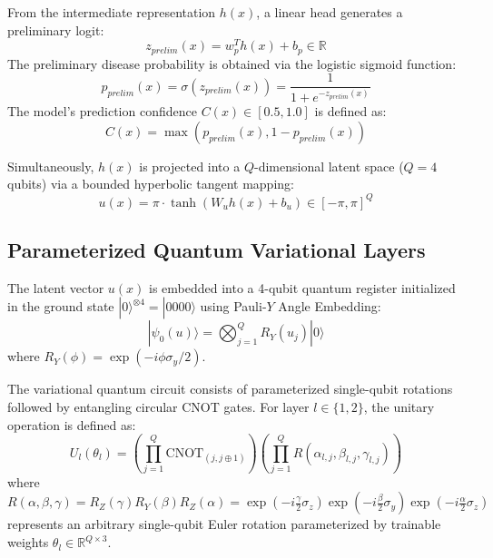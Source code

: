 \documentclass[conference]{IEEEtran}
\begin{document}
From the intermediate representation $h(x)$, a linear head generates a preliminary logit:
\begin{equation}
z_{prelim}(x) = w_p^T h(x) + b_p \in \mathbb{R}
\end{equation}
The preliminary disease probability is obtained via the logistic sigmoid function:
\begin{equation}
p_{prelim}(x) = \sigma(z_{prelim}(x)) = \frac{1}{1 + e^{-z_{prelim}(x)}}
\end{equation}
The model's prediction confidence $C(x) \in [0.5, 1.0]$ is defined as:
\begin{equation}
C(x) = \max\left(p_{prelim}(x), 1 - p_{prelim}(x)\right)
\end{equation}

Simultaneously, $h(x)$ is projected into a $Q$-dimensional latent space ($Q=4$ qubits) via a bounded hyperbolic tangent mapping:
\begin{equation}
u(x) = \pi \cdot \tanh\left(W_u h(x) + b_u\right) \in [-\pi, \pi]^Q
\end{equation}

\subsection{Parameterized Quantum Variational Layers}
The latent vector $u(x)$ is embedded into a 4-qubit quantum register initialized in the ground state $|0\rangle^{\otimes 4} = |0000\rangle$ using Pauli-$Y$ Angle Embedding:
\begin{equation}
|\psi_0(u)\rangle = \bigotimes_{j=1}^Q R_Y(u_j) |0\rangle
\end{equation}
where $R_Y(\phi) = \exp(-i \phi \sigma_y / 2)$.

The variational quantum circuit consists of parameterized single-qubit rotations followed by entangling circular CNOT gates. For layer $l \in \{1, 2\}$, the unitary operation is defined as:
\begin{equation}
U_l(\theta_l) = \left(\prod_{j=1}^Q \text{CNOT}_{(j, j \oplus 1)}\right) \left(\prod_{j=1}^Q R(\alpha_{l,j}, \beta_{l,j}, \gamma_{l,j})\right)
\end{equation}
where $R(\alpha, \beta, \gamma) = R_Z(\gamma) R_Y(\beta) R_Z(\alpha) = \exp(-i \frac{\gamma}{2} \sigma_z) \exp(-i \frac{\beta}{2} \sigma_y) \exp(-i \frac{\alpha}{2} \sigma_z)$ represents an arbitrary single-qubit Euler rotation parameterized by trainable weights $\theta_l \in \mathbb{R}^{Q \times 3}$.
\end{document}
